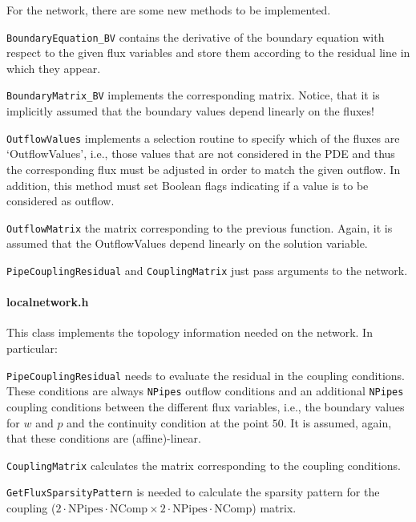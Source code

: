 For the network, there are some new methods to be implemented.

\texttt{BoundaryEquation\_BV} contains the derivative of the
boundary equation with respect to the given flux variables and store
them according to the residual line in which they appear.

\texttt{BoundaryMatrix\_BV} implements the corresponding
matrix. Notice, that it is implicitly assumed that the boundary values
depend linearly on the fluxes!

\texttt{OutflowValues} implements a selection routine to specify which
of the fluxes are `OutflowValues', i.e., those values that are not
considered in the PDE and thus the corresponding flux must be adjusted
in order to match the given outflow.
In addition, this method must set Boolean flags indicating if a value
is to be considered as outflow.

\texttt{OutflowMatrix} the matrix corresponding to the previous
function. Again, it is assumed that the OutflowValues depend linearly
on the solution variable.

\texttt{PipeCouplingResidual} and \texttt{CouplingMatrix} just pass
arguments to the network.

\paragraph{localnetwork.h} This class implements the topology
information needed on the network. In particular:

\texttt{PipeCouplingResidual} needs to evaluate the residual in the 
coupling conditions. These conditions are always \texttt{NPipes}
outflow conditions and an additional \texttt{NPipes} coupling
conditions between the different flux variables, i.e., the boundary
values for $w$ and $p$ and the continuity condition at the point $50$.
It is assumed, again, that these conditions are (affine)-linear.

\texttt{CouplingMatrix} calculates the matrix corresponding to the
coupling conditions.

\texttt{GetFluxSparsityPattern} is needed to calculate the 
sparsity pattern for the coupling ($2\cdot \text{NPipes} \cdot
\text{NComp} \times 2\cdot \text{NPipes} \cdot
\text{NComp}$) matrix. 

